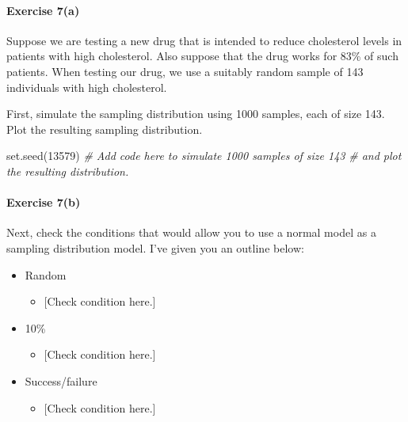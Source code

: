 \documentclass[
]{book}
\newenvironment{Shaded}{\begin{snugshade}}{\end{snugshade}}
\newcommand{\CommentTok}[1]{\textcolor[rgb]{0.56,0.35,0.01}{\textit{#1}}}
\newcommand{\DecValTok}[1]{\textcolor[rgb]{0.00,0.00,0.81}{#1}}
\newcommand{\FunctionTok}[1]{\textcolor[rgb]{0.00,0.00,0.00}{#1}}
\newcommand{\NormalTok}[1]{#1}
\providecommand{\tightlist}{%
  \setlength{\itemsep}{0pt}\setlength{\parskip}{0pt}}
\begin{document}
\hypertarget{exercise-7a-3}{%
\paragraph*{Exercise 7(a)}\label{exercise-7a-3}}

Suppose we are testing a new drug that is intended to reduce cholesterol levels in patients with high cholesterol. Also suppose that the drug works for 83\% of such patients. When testing our drug, we use a suitably random sample of 143 individuals with high cholesterol.

First, simulate the sampling distribution using 1000 samples, each of size 143. Plot the resulting sampling distribution.

\begin{Shaded}
\begin{Highlighting}[]
\FunctionTok{set.seed}\NormalTok{(}\DecValTok{13579}\NormalTok{)}
\CommentTok{\# Add code here to simulate 1000 samples of size 143}
\CommentTok{\# and plot the resulting distribution.}
\end{Highlighting}
\end{Shaded}

\hypertarget{exercise-7b-3}{%
\paragraph*{Exercise 7(b)}\label{exercise-7b-3}}

Next, check the conditions that would allow you to use a normal model as a sampling distribution model. I've given you an outline below:

\begin{itemize}
\tightlist
\item
  Random

  \begin{itemize}
  \tightlist
  \item
    {[}Check condition here.{]}
  \end{itemize}
\item
  10\%

  \begin{itemize}
  \tightlist
  \item
    {[}Check condition here.{]}
  \end{itemize}
\item
  Success/failure

  \begin{itemize}
  \tightlist
  \item
    {[}Check condition here.{]}
  \end{itemize}
\end{itemize}
\end{document}
